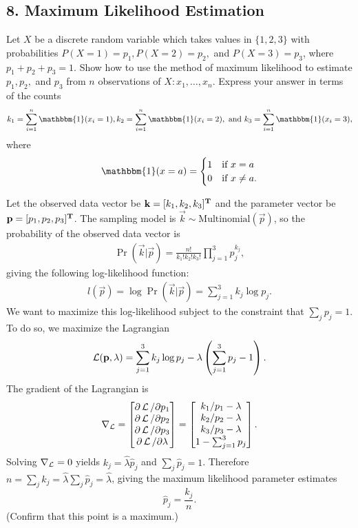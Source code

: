 \documentclass{article}
\begin{document}
\subsection*{8. Maximum Likelihood Estimation}
Let $X$ be a discrete random variable which takes values in $\{1, 2, 3\}$ with probabilities $P(X = 1) = p_1, P(X=2) = p_2,$ and $P(X = 3) = p_3$, where $p_1 + p_2 + p_3 = 1$.  Show how to use the method of maximum likelihood to estimate $p_1, p_2,$ and $p_3$ from $n$ observations of $X: x_1, \ldots, x_n$. Express your answer in terms of the counts $$k_1 = \sum_{i=1}^n \mathbbm{1}(x_i = 1), k_2 = \sum_{i=1}^n \mathbbm{1}(x_i = 2), \text{ and }k_3 = \sum_{i=1}^n \mathbbm{1}(x_i = 3),$$ where
$$\mathbbm{1}(x = a) =
\begin{cases}
1 & \text{if } x = a \\
0 & \text{if } x \neq a.
\end{cases}$$
\begin{mdframed}
  Let the observed data vector be $\mathbf k = [k_1,k_2,k_3]^{\mathbf{T}}$ and the parameter
  vector be $\mathbf p = [p_1, p_2, p_3]^{\mathbf{T}}$. The sampling model is
  $\vec k \sim \text{Multinomial}(\vec p)$, so the probability of the observed
  data vector is
  \begin{align*}
    \Pr(\vec k | \vec p) = \frac{n!}{k_1!k_2!k_3!}\prod_{j=1}^3 p_j^{k_j},
  \end{align*}
  giving the following log-likelihood function:
  \begin{align*}
    l(\vec p) = \log \Pr(\vec k | \vec p) = \sum_{j=1}^3 k_j \log p_j.
  \end{align*}
  We want to maximize this log-likelihood subject to the constraint that
  $\sum_j p_j = 1$. To do so, we maximize the Lagrangian
  \begin{align*}
    \operatorname{\mathcal{L}}(\mathbf p, \lambda) = \sum_{j=1}^3 k_j \log p_j - \lambda\left(\sum_{j=1}^3 p_j - 1\right).
  \end{align*}
  The gradient of the Lagrangian is
  \begin{align*}
    \nabla_{\operatorname{\mathcal{L}}} =
    \begin{bmatrix}
      \partial \operatorname{\mathcal{L}} / \partial p_1\\
      \partial \operatorname{\mathcal{L}} / \partial p_2\\
      \partial \operatorname{\mathcal{L}} / \partial p_3\\
      \partial \operatorname{\mathcal{L}} / \partial \lambda\\
    \end{bmatrix} =
    \begin{bmatrix}
      k_1/p_1 - \lambda\\
      k_2/p_2 - \lambda\\
      k_3/p_3 - \lambda\\
      1 - \sum_{j=1}^3 p_j\\
    \end{bmatrix}.
  \end{align*}
  Solving $\nabla_{\operatorname{\mathcal{L}}} = 0$ yields $k_j = \widehat \lambda \widehat p_j$ and
  $\sum_j \widehat p_j = 1$. Therefore
  $n = \sum_j k_j = \widehat \lambda \sum_j \widehat p_j = \widehat \lambda$,
  giving the maximum likelihood parameter estimates
  $$
  \widehat p_j = \frac{k_j}{n}.
  $$
  (Confirm that this point is a maximum.)
\end{mdframed}
\end{document}
